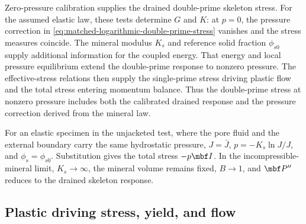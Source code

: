 Zero-pressure calibration supplies the drained double-prime skeleton stress.
For the assumed elastic law, these tests determine \(G\) and \(K\): at
\(p=0\), the pressure correction in
\eqref{eq:matched-logarithmic-double-prime-stress} vanishes and the stress
measures coincide.  The mineral modulus \(K_s\) and reference solid fraction
\(\phi_{s0}\) supply additional information for the coupled energy.
That energy and local pressure equilibrium extend the double-prime response
to nonzero pressure.  The effective-stress relations then supply the single-prime
stress driving plastic flow and the total stress entering momentum balance.
Thus the double-prime stress at nonzero pressure includes both the calibrated
drained response and the pressure correction derived from the mineral law.

For an elastic specimen in the unjacketed test, where the pore fluid and the
external boundary carry the same hydrostatic pressure, \(J=\bar J\),
\(p=-K_s\ln J/J\), and \(\phi_s=\phi_{s0}\).  Substitution gives the total
stress \(-p\mbf I\).  In the incompressible-mineral limit,
\(K_s\to\infty\), the mineral volume remains fixed, \(B\to1\), and
\(\mbf P^{\prime\prime}\) reduces to the drained skeleton response.

\subsection{Plastic driving stress, yield, and flow}
\label{sec:plastic-loading-incremental-rate}

